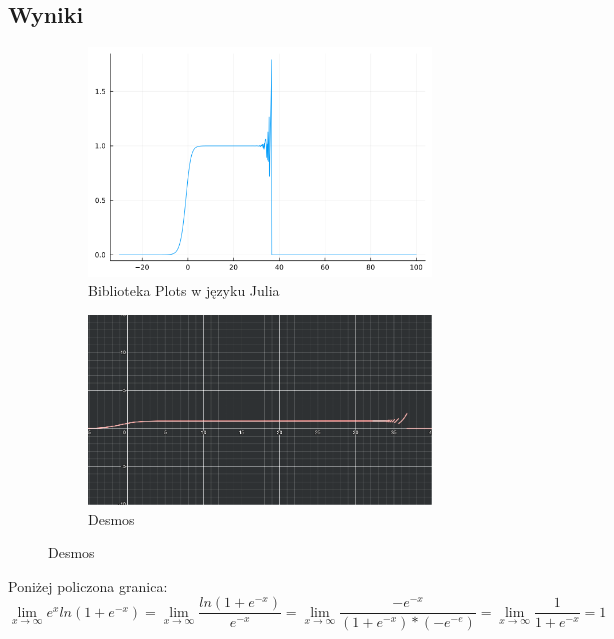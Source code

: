 \documentclass{article}
\def\v{0.47}
\begin{document}
\subsection*{Wyniki}
	\begin{figure}[H]
		\centering
		\begin{subfigure}[b]{\v\linewidth}
			\includegraphics[width=\linewidth]{graphs/2.1.png}
			\caption{Biblioteka Plots w języku Julia}
			\label{fig:enter-label}
		\end{subfigure}
		\begin{subfigure}[b]{\v\linewidth}
			\includegraphics[width=\linewidth]{graphs/2.2.png}
			\caption{Desmos}
			\label{fig:enter-label}
		\end{subfigure}
	\end{figure}
	Poniżej policzona granica: \\
	\[\lim_{x\to\infty}e^xln(1+e^{-x})=\lim_{x\to\infty}\frac{ln(1+e^{-x})}{e^{-x}}=\lim_{x\to\infty}\frac{-e^{-x}}{(1+e^{-x})*(-e^{-e})}=\lim_{x\to\infty}\frac{1}{1+e^{-x}}=1\]
\end{document}
